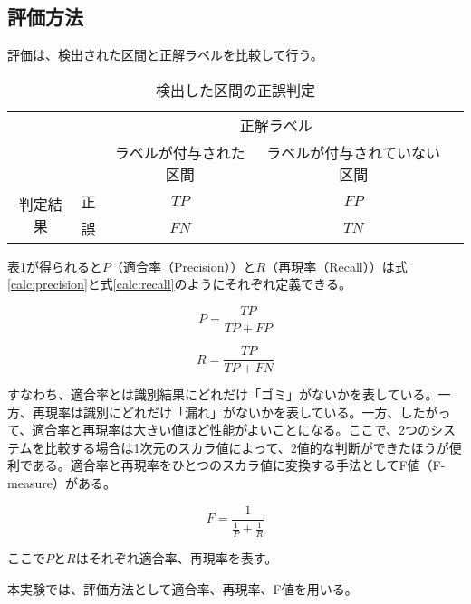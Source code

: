 \subsection{評価方法}
評価は、検出された区間と正解ラベルを比較して行う。

\begin{table}[H]
\begin{center}
    \caption{検出した区間の正誤判定 \label{table:search_table}}
\begin{tabular}{|c|c|c|c|l}
\cline{1-4}
\multicolumn{2}{|c|}{\multirow{2}{*}{}} & \multicolumn{2}{c|}{正解ラベル} &  \\ \cline{3-4}
\multicolumn{2}{|c|}{}                  & ラベルが付与された区間        &    ラベルが付与されていない区間     &  \\ \cline{1-4}
\multirow{2}{*}{判定結果}        & 正        & $TP$                  & $FP$                   &  \\ \cline{2-4}
& 誤        & $FN$                  & $TN$                   &  \\ \cline{1-4}
\end{tabular}
\end{center}
\end{table}

表\ref{table:search_table}が得られると$P$（適合率（Precision））と$R$（再現率（Recall））は式\ref{calc:precision}と式\ref{calc:recall}のようにそれぞれ定義できる。

\begin{equation}
\label{calc:precision}
P = \frac{TP}{TP + FP}
\end{equation}

\begin{equation}
\label{calc:recall}
R = \frac{TP}{TP + FN}
\end{equation}

すなわち、適合率とは識別結果にどれだけ「ゴミ」がないかを表している。一方、再現率は識別にどれだけ「漏れ」がないかを表している。一方、したがって、適合率と再現率は大きい値ほど性能がよいことになる。ここで、2つのシステムを比較する場合は1次元のスカラ値によって、2値的な判断ができたほうが便利である。適合率と再現率をひとつのスカラ値に変換する手法としてF値（F-measure）がある。

\begin{equation}
\label{calc:fmeasure}
F = \frac{1}{\frac{1}{P} + \frac{1}{R}}
\end{equation}

ここで$P$と$R$はそれぞれ適合率、再現率を表す。\par
本実験では、評価方法として適合率、再現率、F値を用いる。


